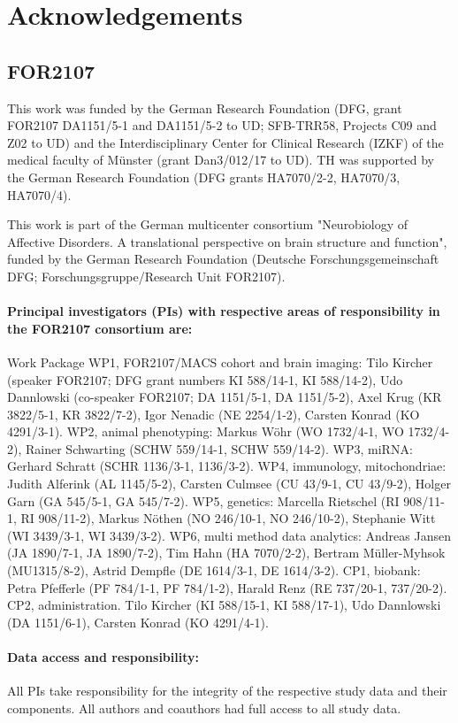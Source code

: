 \documentclass[12pt,a4paper]{article}
\begin{document}
    \section*{Acknowledgements}
    \subsection*{FOR2107}
    This work was funded by the German Research Foundation (DFG, grant FOR2107 DA1151/5-1 and DA1151/5-2 to UD; SFB-TRR58, Projects C09 and Z02 to UD) and the Interdisciplinary Center for Clinical Research (IZKF) of the medical faculty of Münster (grant Dan3/012/17 to UD). TH was supported by the German Research Foundation (DFG grants HA7070/2-2, HA7070/3, HA7070/4).

    This work is part of the German multicenter consortium "Neurobiology of Affective Disorders. A translational perspective on brain structure and function", funded by the German Research Foundation (Deutsche Forschungsgemeinschaft DFG; Forschungsgruppe/Research Unit FOR2107).

    \paragraph{Principal investigators (PIs) with respective areas of responsibility in the FOR2107 consortium are:}
    Work Package WP1, FOR2107/MACS cohort and brain imaging: Tilo Kircher (speaker FOR2107; DFG grant numbers KI 588/14-1, KI 588/14-2), Udo Dannlowski (co-speaker FOR2107; DA 1151/5-1, DA 1151/5-2), Axel Krug (KR 3822/5-1, KR 3822/7-2), Igor Nenadic (NE 2254/1-2), Carsten Konrad (KO 4291/3-1). WP2, animal phenotyping: Markus Wöhr (WO 1732/4-1, WO 1732/4-2), Rainer Schwarting (SCHW 559/14-1, SCHW 559/14-2). WP3, miRNA: Gerhard Schratt (SCHR 1136/3-1, 1136/3-2). WP4, immunology, mitochondriae: Judith Alferink (AL 1145/5-2), Carsten Culmsee (CU 43/9-1, CU 43/9-2), Holger Garn (GA 545/5-1, GA 545/7-2). WP5, genetics: Marcella Rietschel (RI 908/11-1, RI 908/11-2), Markus Nöthen (NO 246/10-1, NO 246/10-2), Stephanie Witt (WI 3439/3-1, WI 3439/3-2). WP6, multi method data analytics: Andreas Jansen (JA 1890/7-1, JA 1890/7-2), Tim Hahn (HA 7070/2-2), Bertram Müller-Myhsok (MU1315/8-2), Astrid Dempfle (DE 1614/3-1, DE 1614/3-2). CP1, biobank: Petra Pfefferle (PF 784/1-1, PF 784/1-2), Harald Renz (RE 737/20-1, 737/20-2). CP2, administration. Tilo Kircher (KI 588/15-1, KI 588/17-1), Udo Dannlowski (DA 1151/6-1), Carsten Konrad (KO 4291/4-1).

    \paragraph{Data access and responsibility:}
    All PIs take responsibility for the integrity of the respective study data and their components. All authors and coauthors had full access to all study data.
\end{document}
